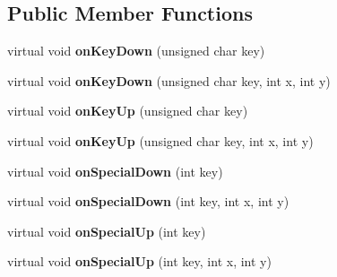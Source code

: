 \subsection*{Public Member Functions}
\begin{DoxyCompactItemize}
\item 
\hypertarget{classj3d_1_1core_1_1ControlBatch_a91912cb466353b27388783f5ba36772a}{}virtual void {\bfseries on\+Key\+Down} (unsigned char key)\label{classj3d_1_1core_1_1ControlBatch_a91912cb466353b27388783f5ba36772a}

\item 
\hypertarget{classj3d_1_1core_1_1ControlBatch_a3da36986da46c72e4546bc6a41097862}{}virtual void {\bfseries on\+Key\+Down} (unsigned char key, int x, int y)\label{classj3d_1_1core_1_1ControlBatch_a3da36986da46c72e4546bc6a41097862}

\item 
\hypertarget{classj3d_1_1core_1_1ControlBatch_af28700dc578d720005442cd6f66d411a}{}virtual void {\bfseries on\+Key\+Up} (unsigned char key)\label{classj3d_1_1core_1_1ControlBatch_af28700dc578d720005442cd6f66d411a}

\item 
\hypertarget{classj3d_1_1core_1_1ControlBatch_ac8a055024f03e669bbb7ffdf2aafd747}{}virtual void {\bfseries on\+Key\+Up} (unsigned char key, int x, int y)\label{classj3d_1_1core_1_1ControlBatch_ac8a055024f03e669bbb7ffdf2aafd747}

\item 
\hypertarget{classj3d_1_1core_1_1ControlBatch_a68b3d00ca4ac0cbd3ff6306069002d79}{}virtual void {\bfseries on\+Special\+Down} (int key)\label{classj3d_1_1core_1_1ControlBatch_a68b3d00ca4ac0cbd3ff6306069002d79}

\item 
\hypertarget{classj3d_1_1core_1_1ControlBatch_a83487b7d6cdb4cdf1471be56dbc99afd}{}virtual void {\bfseries on\+Special\+Down} (int key, int x, int y)\label{classj3d_1_1core_1_1ControlBatch_a83487b7d6cdb4cdf1471be56dbc99afd}

\item 
\hypertarget{classj3d_1_1core_1_1ControlBatch_a6b4c76c0ea6bfe9a52993217349214ec}{}virtual void {\bfseries on\+Special\+Up} (int key)\label{classj3d_1_1core_1_1ControlBatch_a6b4c76c0ea6bfe9a52993217349214ec}

\item 
\hypertarget{classj3d_1_1core_1_1ControlBatch_a948cd5e98a6c9776acfdad2c1d3c9c6d}{}virtual void {\bfseries on\+Special\+Up} (int key, int x, int y)\label{classj3d_1_1core_1_1ControlBatch_a948cd5e98a6c9776acfdad2c1d3c9c6d}


\end{DoxyCompactItemize}
